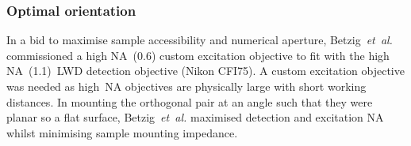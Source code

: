 \subsubsection{Optimal orientation}

In a bid to maximise sample accessibility and numerical aperture, Betzig~\emph{et~al.}~\cite{chenLatticeLightSheetMicroscopy2014} commissioned a high \gls{NA}~(\SI{0.6}{}) custom excitation objective to fit with the high \gls{NA}~(\SI{1.1}{})~\gls{LWD} detection objective (Nikon CFI75).
A custom excitation objective was needed as high~\gls{NA} objectives are physically large with short \gls{working distance}s.
In mounting the orthogonal pair at an angle such that they were planar so a flat surface, Betzig~\emph{et~al.} maximised detection and excitation \gls{NA} whilst minimising sample mounting impedance.

%





